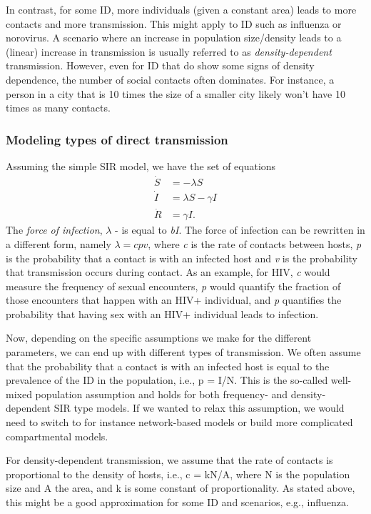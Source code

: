 \documentclass[]{article}
\theoremstyle{definition}
\theoremstyle{definition}
\theoremstyle{definition}
\theoremstyle{remark}
\begin{document}
In contrast, for some ID, more individuals (given a constant area) leads
to more contacts and more transmission. This might apply to ID such as
influenza or norovirus. A scenario where an increase in population
size/density leads to a (linear) increase in transmission is usually
referred to as \emph{density-dependent} transmission. However, even for
ID that do show some signs of density dependence, the number of social
contacts often dominates. For instance, a person in a city that is 10
times the size of a smaller city likely won't have 10 times as many
contacts.

\subsubsection{Modeling types of direct
transmission}\label{myadvancedbox}

Assuming the simple SIR model, we have the set of equations \[ 
\begin{aligned}
\dot S &= - \lambda S \\
\dot I &= \lambda S  - \gamma I \\
\dot R &= \gamma I.
\end{aligned}
\] The \emph{force of infection}, \(\lambda\) - is equal to \emph{bI}.
The force of infection can be rewritten in a different form, namely
\(\lambda= cpv\), where \emph{c} is the rate of contacts between hosts,
\emph{p} is the probability that a contact is with an infected host and
\emph{v} is the probability that transmission occurs during contact. As
an example, for HIV, \emph{c} would measure the frequency of sexual
encounters, \emph{p} would quantify the fraction of those encounters
that happen with an HIV+ individual, and \emph{p} quantifies the
probability that having sex with an HIV+ individual leads to infection.

Now, depending on the specific assumptions we make for the different
parameters, we can end up with different types of transmission. We often
assume that the probability that a contact is with an infected host is
equal to the prevalence of the ID in the population, i.e., p = I/N. This
is the so-called well-mixed population assumption and holds for both
frequency- and density-dependent SIR type models. If we wanted to relax
this assumption, we would need to switch to for instance network-based
models or build more complicated compartmental models.

For density-dependent transmission, we assume that the rate of contacts
is proportional to the density of hosts, i.e., c = kN/A, where N is the
population size and A the area, and k is some constant of
proportionality. As stated above, this might be a good approximation for
some ID and scenarios, e.g., influenza.
\end{document}
